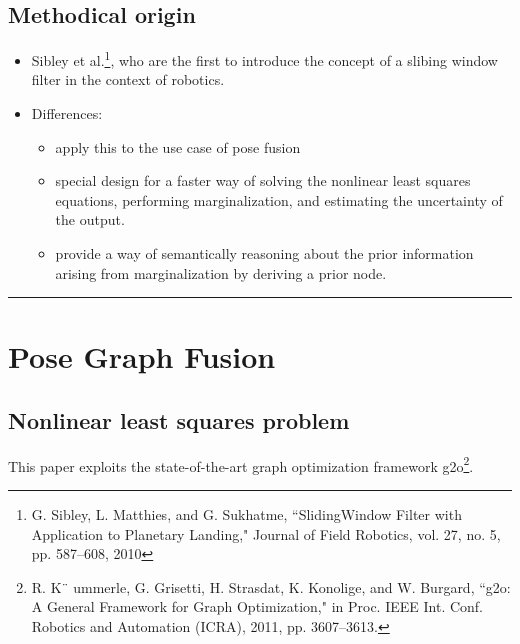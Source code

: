 \documentclass[letterpaper,11pt]{article}
\begin{document}
\subsection{Methodical origin}

\begin{itemize}
	\item Sibley et al.\footnote{G. Sibley, L. Matthies, and G. Sukhatme, ``SlidingWindow Filter with Application to Planetary Landing," Journal of Field Robotics, vol. 27, no. 5, pp. 587–608, 2010}, who are the first to introduce the concept of a slibing window filter in the context of robotics.
	\item Differences:
	\begin{itemize}
		\item apply this to the use case of pose fusion
		\item special design for a faster way of solving the nonlinear least squares equations, performing marginalization, and estimating the uncertainty of the output.
		\item provide a way of semantically reasoning about the prior information arising from marginalization by deriving a prior node.
	\end{itemize}
\end{itemize}

\begin{center}\rule{\textwidth}{1pt}\end{center}
\section{Pose Graph Fusion}

\subsection{Nonlinear least squares problem}

This paper exploits the state-of-the-art graph optimization framework g2o\footnote{R. K¨ ummerle, G. Grisetti, H. Strasdat, K. Konolige, and W. Burgard, ``g2o: A General Framework for Graph Optimization," in Proc. IEEE Int. Conf. Robotics and Automation (ICRA), 2011, pp. 3607–3613.}.
\end{document}

